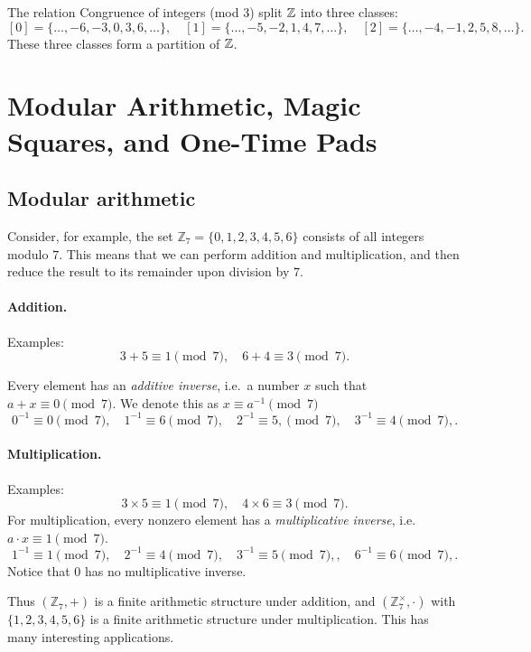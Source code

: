 \begin{example}
The relation Congruence of integers (mod $3$)  split $\mathbb{Z}$  into three classes:
\[
[0] = \{\dots,-6,-3,0,3,6,\dots\}, \quad
[1] = \{\dots,-5,-2,1,4,7,\dots\}, \quad
[2] = \{\dots,-4,-1,2,5,8,\dots\}.
\]
These three classes form a partition of $\mathbb{Z}$.
\end{example}

\section{Modular Arithmetic, Magic Squares, and One-Time Pads}
\label{sec:modular}

\subsection{Modular arithmetic}
Consider, for example, the set $\mathbb{Z}_7 = \{0,1,2,3,4,5,6\}$ consists of all integers modulo $7$. 
This means that we can perform addition and multiplication, and then reduce the result 
to its remainder upon division by $7$.

\paragraph{Addition.}
Examples:
\[
3 + 5 \equiv 1 \pmod{7}, \quad 6 + 4 \equiv 3 \pmod{7}.
\]

Every element has an \emph{additive inverse}, i.e.\ a number $x$ such that 
$a + x \equiv 0 \pmod{7}$. We denote this as $x \equiv a^{-1} \pmod{7}$
\[
0^{-1} \equiv 0 \pmod{7},\quad 1^{-1} \equiv 6 \pmod{7}, \quad 2^{-1} \equiv 5, \pmod{7},\quad 3^{-1} \equiv 4 \pmod{7},.
\]

\paragraph{Multiplication.}
Examples:
\[
3 \times 5 \equiv 1 \pmod{7}, \quad 4 \times 6 \equiv 3 \pmod{7}.
\]
For multiplication, every nonzero element has a \emph{multiplicative inverse}, 
i.e.\ $a \cdot x \equiv 1 \pmod{7}$.
\[
1^{-1} \equiv 1 \pmod{7},\quad 2^{-1} \equiv 4 \pmod{7},\quad 3^{-1} \equiv 5 \pmod{7},,\quad 6^{-1} \equiv 6 \pmod{7},.
\]
Notice that $0$ has no multiplicative inverse.

Thus $(\mathbb{Z}_7, +)$ is a finite arithmetic structure under addition, 
and $(\mathbb{Z}_7^\times,\cdot)$ with $\{1,2,3,4,5,6\}$ is a finite arithmetic structure under multiplication. This has many interesting applications.

